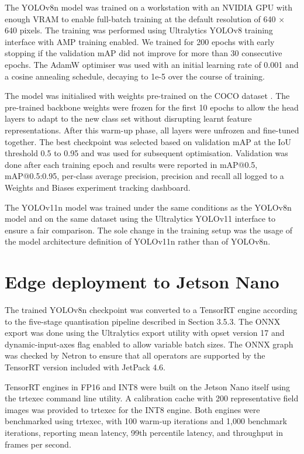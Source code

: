 \documentclass[12pt,a4paper]{report}
\begin{document}
The YOLOv8n model was trained on a workstation with an NVIDIA GPU with enough VRAM to enable full-batch training at the default resolution of 640 $\times$ 640 pixels. The training was performed using Ultralytics YOLOv8 training interface with AMP training enabled. We trained for 200 epochs with early stopping if the validation mAP did not improve for more than 30 consecutive epochs. The AdamW optimiser was used with an initial learning rate of 0.001 and a cosine annealing schedule, decaying to 1e-5 over the course of training.

The model was initialised with weights pre-trained on the COCO dataset . The pre-trained backbone weights were frozen for the first 10 epochs to allow the head layers to adapt to the new class set without disrupting learnt feature representations. After this warm-up phase, all layers were unfrozen and fine-tuned together. The best checkpoint was selected based on validation mAP at the IoU threshold 0.5 to 0.95 and was used for subsequent optimisation. Validation was done after each training epoch and results were reported in mAP@0.5, mAP@0.5:0.95, per-class average precision, precision and recall all logged to a Weights and Biases experiment tracking dashboard.

The YOLOv11n model was trained under the same conditions as the YOLOv8n model and on the same dataset using the Ultralytics YOLOv11 interface to ensure a fair comparison. The sole change in the training setup was the usage of the model architecture definition of YOLOv11n rather than of YOLOv8n.

\section{Edge deployment to Jetson Nano}

The trained YOLOv8n checkpoint was converted to a TensorRT engine according to the five-stage quantisation pipeline described in Section 3.5.3. The ONNX export was done using the Ultralytics export utility with opset version 17 and dynamic-input-axes flag enabled to allow variable batch sizes. The ONNX graph was checked by Netron to ensure that all operators are supported by the TensorRT version included with JetPack 4.6.

TensorRT engines in FP16 and INT8 were built on the Jetson Nano itself using the trtexec command line utility. A calibration cache with 200 representative field images was provided to trtexec for the INT8 engine. Both engines were benchmarked using trtexec, with 100 warm-up iterations and 1,000 benchmark iterations, reporting mean latency, 99th percentile latency, and throughput in frames per second.
\end{document}
